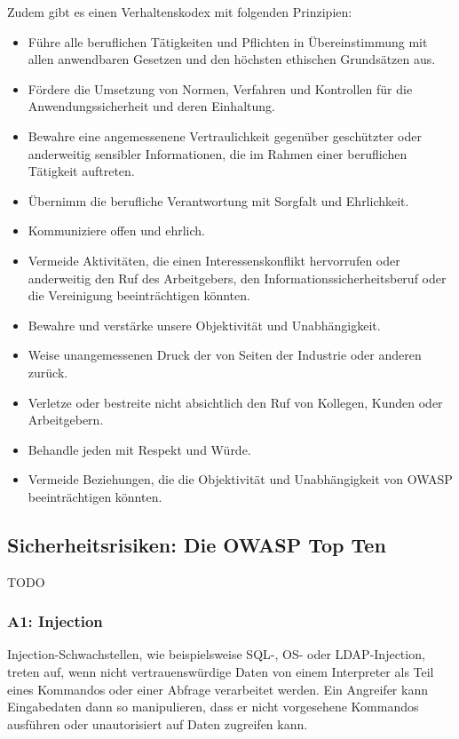 \documentclass[12pt,oneside,a4paper,parskip]{scrbook}
\begin{document}
  Zudem gibt es einen Verhaltenskodex mit folgenden Prinzipien:
  \begin{itemize}
    \item Führe alle beruflichen Tätigkeiten und Pflichten in Übereinstimmung mit allen anwendbaren Gesetzen und den höchsten ethischen Grundsätzen aus.
    \item Fördere die Umsetzung von Normen, Verfahren und Kontrollen für die Anwendungssicherheit und deren Einhaltung.
    \item Bewahre eine angemessenene Vertraulichkeit gegenüber geschützter oder anderweitig sensibler Informationen, die im Rahmen einer beruflichen Tätigkeit auftreten.
    \item Übernimm die berufliche Verantwortung mit Sorgfalt und Ehrlichkeit.
    \item Kommuniziere offen und ehrlich.
    \item Vermeide Aktivitäten, die einen Interessenskonflikt hervorrufen oder anderweitig den Ruf des Arbeitgebers, den Informationssicherheitsberuf oder die Vereinigung beeinträchtigen könnten.
    \item Bewahre und verstärke unsere Objektivität und Unabhängigkeit.
    \item Weise unangemessenen Druck der von Seiten der Industrie oder anderen zurück.
    \item Verletze oder bestreite nicht absichtlich den Ruf von Kollegen, Kunden oder Arbeitgebern.
    \item Behandle jeden mit Respekt und Würde.
    \item Vermeide Beziehungen, die die Objektivität und Unabhängigkeit von OWASP  beeinträchtigen könnten.
  \end{itemize}

\cite{OWASPabout}

    \subsection{Sicherheitsrisiken: Die OWASP Top Ten}
    TODO
\cite{OWASPtop10}

    \subsubsection{A1: Injection}
    Injection-Schwachstellen, wie beispielsweise SQL-, OS- oder LDAP-Injection, treten auf, wenn
    nicht vertrauenswürdige Daten von einem Interpreter als Teil eines Kommandos oder einer
    Abfrage verarbeitet werden. Ein Angreifer kann Eingabedaten dann so manipulieren, dass er nicht
    vorgesehene Kommandos ausführen oder unautorisiert auf Daten zugreifen kann.
\end{document}
